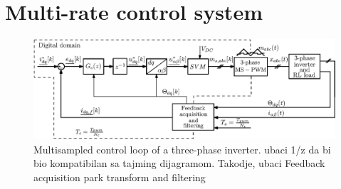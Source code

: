 \documentclass[journal]{IEEEtran}
\begin{document}
 
\section{Multi-rate control system}

\begin{figure}[t!]
    \centerline{\includegraphics[width=0.95\linewidth]{figures/schematic.eps}}
    \caption{Multisampled control loop of a three-phase inverter. ubaci 1/z da bi bio kompatibilan sa tajming dijagramom. Takodje, ubaci Feedback acquisition park transform and filtering}
    \label{fig:MSControl}
\end{figure}
\end{document}
